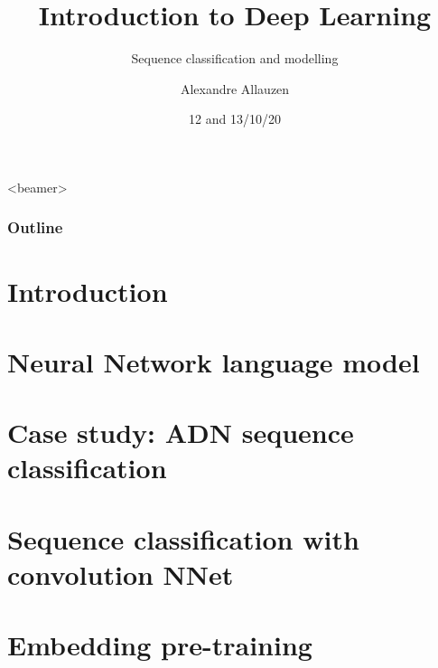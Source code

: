 \documentclass[10pt]{beamer}
\title[IDL@BME-BIN] %
{Introduction to Deep Learning}
\subtitle{Sequence classification and modelling}
\author[A. Allauzen] %
{Alexandre Allauzen}
\institute[ESPCI/Dauphine/PSL] %
{
\texttt{[image: ../logos/espci\_blue.png]}\hfill
\raisebox{1.75ex}{\texttt{[image: ../logos/dauphine.png]}}\\
\hfill\texttt{[image: ../logos/logomiles\_white.pdf]}
}
\date{12 and 13/10/20} %
\begin{document}

\begin{frame}
  \titlepage
\end{frame}

\begin{frame}<beamer>
  \frametitle{Outline}
  \tableofcontents
\end{frame}
 






\section{Introduction}


\section{Neural Network language model}


\section{Case study: ADN sequence classification}


\section{Sequence classification with convolution NNet}


\section{Embedding pre-training}









{\footnotesize }
\end{document}
